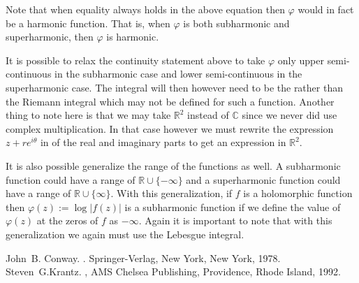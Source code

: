 \documentclass[12pt]{article}
\theoremstyle{theorem}
\theoremstyle{definition}
\theoremstyle{remark}
\begin{document}
Note that when equality always holds in the above equation then $\varphi$ would
in fact be a harmonic function.  That is, when $\varphi$ is both subharmonic and
superharmonic, then $\varphi$ is harmonic.

It is possible to relax the continuity statement above to take $\varphi$ only upper semi-continuous in the subharmonic case and lower semi-continuous in the
superharmonic case.  The integral will then however need to be the 
 rather than the Riemann integral which may not be defined for such
a function.  Another thing to note here is that we may take ${\mathbb{R}}^2$ instead of ${\mathbb{C}}$ since we never did use complex multiplication.  In that case however we must rewrite the expression $z + r e^{i\theta}$ in  of the
real and imaginary parts to get an expression in ${\mathbb{R}}^2$.

It is also possible generalize the range of the functions as well.  A subharmonic function could have a range of ${\mathbb{R}} \cup \{ -\infty \}$
and a superharmonic function could have a range of ${\mathbb{R}} \cup \{ \infty \}$.  With this generalization, if $f$ is a holomorphic function
then $\varphi(z) := \log \lvert f(z) \rvert$ is a subharmonic function if we 
define the value of $\varphi(z)$ at the zeros of $f$ as $-\infty$. 
Again it is important to note that with this
generalization we again must use the Lebesgue integral.

\begin{thebibliography}{9}
John~B. Conway.
{\em {}}.
Springer-Verlag, New York, New York, 1978.
Steven~G.\@ Krantz.
{\em {}},
AMS Chelsea Publishing, Providence, Rhode Island, 1992.
\end{thebibliography}
\end{document}
